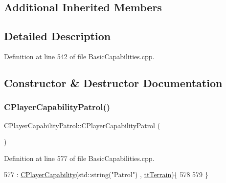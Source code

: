 \subsection*{Additional Inherited Members}


\subsection{Detailed Description}


Definition at line 542 of file Basic\+Capabilities.\+cpp.



\subsection{Constructor \& Destructor Documentation}
\hypertarget{classCPlayerCapabilityPatrol_a9c8653e6b0509a753d0b084f3988953b}{}\label{classCPlayerCapabilityPatrol_a9c8653e6b0509a753d0b084f3988953b} 
\subsubsection{\texorpdfstring{C\+Player\+Capability\+Patrol()}{CPlayerCapabilityPatrol()}}
{\footnotesize\ttfamily C\+Player\+Capability\+Patrol\+::\+C\+Player\+Capability\+Patrol (\begin{DoxyParamCaption}{ }\end{DoxyParamCaption})\hspace{0.3cm}{\ttfamily [protected]}}



Definition at line 577 of file Basic\+Capabilities.\+cpp.


\begin{DoxyCode}
577                                                  : \hyperlink{classCPlayerCapability_a303de62aba5d3f65d9a8e013c64a96c1}{CPlayerCapability}(std::string(\textcolor{stringliteral}{"Patrol"})
      , \hyperlink{classCPlayerCapability_a9d3450ed1532fd536bd6cbb1e2eef02fa465193c39da3100a1ce87c4a01a7ec2f}{ttTerrain})\{
578 
579 \}
\end{DoxyCode}
\hypertarget{classCPlayerCapabilityPatrol_a1f27cf43aabf3360d5db92fd23b55c01}{}\label{classCPlayerCapabilityPatrol_a1f27cf43aabf3360d5db92fd23b55c01} 
